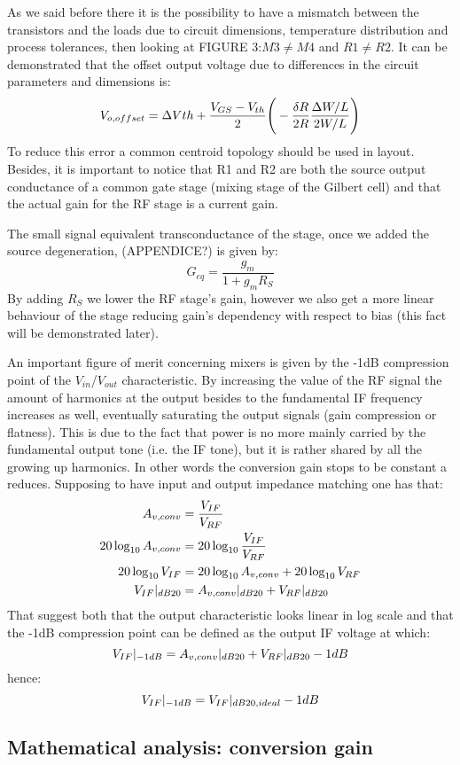 As we said before there it is the possibility to have a mismatch between the transistors and the loads due to circuit dimensions, temperature distribution and process tolerances, then looking at FIGURE 3:$M3 \neq M4$ and $R1 \neq R2$. It can be demonstrated that the offset output voltage due to differences in the circuit parameters and dimensions is:
\begin{equation}
V_{o,offset}= \Delta V{th}+\frac{V_{GS}-V_{th}}{2}\Bigg(-\frac{\delta R}{2R}\frac{\Delta W /L}{2W/L}\Bigg) \notag
\end{equation}
To reduce this error a common centroid topology should be used in layout.
Besides, it is important to notice that R1 and R2 are both the source output conductance of a common gate stage (mixing stage of the Gilbert cell) and that the actual gain for the RF stage is a current gain. 

The small signal equivalent transconductance of the stage, once we added the source degeneration, (APPENDICE?) is given by:
\begin{equation}
G_{eq} = \frac{g_m}{1+g_m R_S}
\end{equation}
By adding $R_S$ we lower the RF stage's gain, however  we also get a more linear behaviour of the stage reducing gain's dependency with respect to bias (this fact will be demonstrated later).

An important figure of merit concerning mixers is given by the -1dB compression point of the $V_{in}$/$V_{out}$ characteristic. By increasing the value of the RF signal the amount of harmonics at the output besides to the fundamental IF frequency increases as well, eventually saturating the output signals (gain compression or flatness). This is due to the fact that power is no more mainly carried by the fundamental output tone (i.e. the IF tone), but it is rather shared by all the growing up harmonics. In other words the conversion gain stops to be constant a reduces. Supposing to have input and output impedance matching one has that:
\begin{align}
	A_{v,conv}&=\frac{V_{IF}}{V_{RF}} \notag \\
	20\log_{10}A_{v,conv} & = 20\log_{10}\frac{V_{IF}}{V_{RF}}  \notag \\
	20\log_{10}V_{IF} & = 20\log_{10}A_{v,conv} + 20\log_{10}V_{RF} \notag \\	V_{IF}|_{dB20} &= A_{v,conv}|_{dB20} + V_{RF}|_{dB20} \notag
\end{align}
That suggest both that the output characteristic looks linear in log scale and that the -1dB compression point can be defined as the output IF voltage at which:
\begin{equation}
V_{IF}|_{-1dB} = A_{v,conv}|_{dB20} + V_{RF}|_{dB20} -1dB \notag
\end{equation}
hence:
\begin{equation}
V_{IF}|_{-1dB} = V_{IF}|_{dB20,ideal} -1dB \notag
\end{equation}
 

\subsection{Mathematical analysis: conversion gain}




